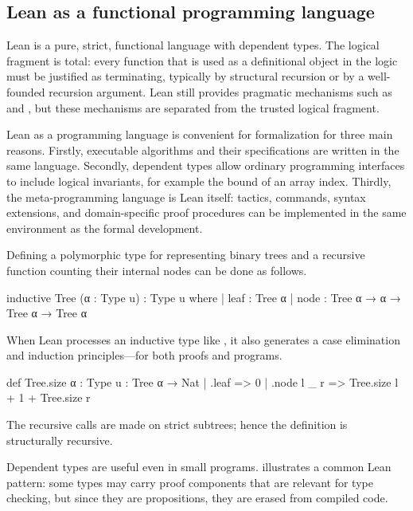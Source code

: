 \subsection{Lean as a functional programming language}
\label{subsec:lean-programming}

Lean is a pure, strict, functional language with dependent types.
The logical fragment is total: every function that is used as a definitional object in the logic must be justified as terminating, typically by structural recursion or by a well-founded recursion argument.
Lean still provides pragmatic mechanisms such as  and , but these mechanisms are separated from the trusted logical fragment.

Lean as a programming language is convenient for formalization for three main reasons.
Firstly, executable algorithms and their specifications are written in the same
language.
Secondly, dependent types allow ordinary programming interfaces to
include logical invariants, for example the bound of an array index.
Thirdly, the meta-programming language is Lean itself: tactics, commands, syntax
extensions, and domain-specific proof procedures can be implemented in the same
environment as the formal development.

\begin{example}
\label{ex:lean-inductive}
Defining a polymorphic type for representing binary trees and a recursive function counting their internal nodes can be done as follows.

\begin{leanlisting}
inductive Tree (α : Type u) : Type u where
  | leaf : Tree α
  | node : Tree α → α → Tree α → Tree α
\end{leanlisting}

When Lean processes an inductive type like , it also generates a case elimination and induction principles---for both proofs and programs.

\begin{leanlisting}
def Tree.size {α : Type u} : Tree α → Nat
  | .leaf => 0
  | .node l _ r => Tree.size l + 1 + Tree.size r
\end{leanlisting}
The recursive calls are made on strict subtrees; hence the definition is structurally recursive.
\end{example}

Dependent types are useful even in small programs.
 illustrates a common Lean pattern: some types may carry proof components that are relevant for type checking, but since they are propositions, they are erased from compiled code.

